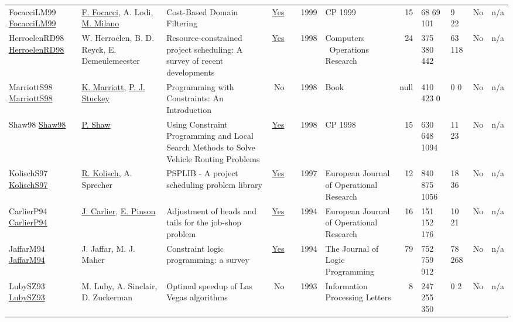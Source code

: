{\begin{longtable}{>{\raggedright\arraybackslash}p{3cm}>{\raggedright\arraybackslash}p{4.5cm}>{\raggedright\arraybackslash}p{6.0cm}rrrp{2.5cm}rp{1cm}p{1cm}rr}
FocacciLM99 \href{https://doi.org/10.1007/978-3-540-48085-3_14}{FocacciLM99} & \hyperref[auth:a776]{F. Focacci}, A. Lodi, \hyperref[auth:a143]{M. Milano} & Cost-Based Domain Filtering & \href{../works/FocacciLM99.pdf}{Yes} & \cite{FocacciLM99} & 1999 & CP 1999 & 15 & 68 69 101 & 9 22 & No & n/a\\
HerroelenRD98 \href{http://dx.doi.org/10.1016/s0305-0548(97)00055-5}{HerroelenRD98} & W. Herroelen, B. D. Reyck, E. Demeulemeester & \cellcolor{green!10}Resource-constrained project scheduling: A survey of recent developments & \href{../works/HerroelenRD98.pdf}{Yes} & \cite{HerroelenRD98} & 1998 & Computers \  Operations Research & 24 & 375 380 442 & 63 118 & No & n/a\\
MarriottS98 \href{http://dx.doi.org/10.7551/mitpress/5625.001.0001}{MarriottS98} & \hyperref[auth:a688]{K. Marriott}, \hyperref[auth:a125]{P. J. Stuckey} & Programming with Constraints: An Introduction & No & \cite{MarriottS98} & 1998 & Book & null & 410 423 0 & 0 0 & No & n/a\\
Shaw98 \href{https://doi.org/10.1007/3-540-49481-2_30}{Shaw98} & \hyperref[auth:a120]{P. Shaw} & Using Constraint Programming and Local Search Methods to Solve Vehicle Routing Problems & \href{../works/Shaw98.pdf}{Yes} & \cite{Shaw98} & 1998 & CP 1998 & 15 & 630 648 1094 & 11 23 & No & n/a\\
KolischS97 \href{http://dx.doi.org/10.1016/s0377-2217(96)00170-1}{KolischS97} & \hyperref[auth:a440]{R. Kolisch}, A. Sprecher & \cellcolor{green!10}PSPLIB - A project scheduling problem library & \href{../works/KolischS97.pdf}{Yes} & \cite{KolischS97} & 1997 & European Journal of Operational Research & 12 & 840 875 1056 & 18 36 & No & n/a\\
CarlierP94 \href{http://dx.doi.org/10.1016/0377-2217(94)90379-4}{CarlierP94} & \hyperref[auth:a845]{J. Carlier}, \hyperref[auth:a846]{E. Pinson} & Adjustment of heads and tails for the job-shop problem & \href{../works/CarlierP94.pdf}{Yes} & \cite{CarlierP94} & 1994 & European Journal of Operational Research & 16 & 151 152 176 & 10 21 & No & n/a\\
JaffarM94 \href{http://dx.doi.org/10.1016/0743-1066(94)90033-7}{JaffarM94} & J. Jaffar, M. J. Maher & \cellcolor{gold!20}Constraint logic programming: a survey & \href{../works/JaffarM94.pdf}{Yes} & \cite{JaffarM94} & 1994 & The Journal of Logic Programming & 79 & 752 759 912 & 78 268 & No & n/a\\
LubySZ93 \href{http://dx.doi.org/10.1016/0020-0190(93)90029-9}{LubySZ93} & M. Luby, A. Sinclair, D. Zuckerman & Optimal speedup of Las Vegas algorithms & No & \cite{LubySZ93} & 1993 & Information Processing Letters & 8 & 247 255 350 & 0 2 & No & n/a\\

\end{longtable}}
